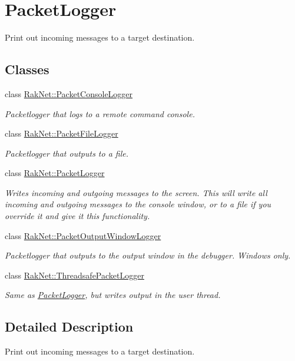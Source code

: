 \hypertarget{group___p_a_c_k_e_t_l_o_g_g_e_r___g_r_o_u_p}{\section{Packet\-Logger}
\label{group___p_a_c_k_e_t_l_o_g_g_e_r___g_r_o_u_p}
}


Print out incoming messages to a target destination.  


\subsection*{Classes}
\begin{DoxyCompactItemize}
\item 
class \hyperlink{class_rak_net_1_1_packet_console_logger}{Rak\-Net\-::\-Packet\-Console\-Logger}
\begin{DoxyCompactList}\small\item\em Packetlogger that logs to a remote command console. \end{DoxyCompactList}\item 
class \hyperlink{class_rak_net_1_1_packet_file_logger}{Rak\-Net\-::\-Packet\-File\-Logger}
\begin{DoxyCompactList}\small\item\em Packetlogger that outputs to a file. \end{DoxyCompactList}\item 
class \hyperlink{class_rak_net_1_1_packet_logger}{Rak\-Net\-::\-Packet\-Logger}
\begin{DoxyCompactList}\small\item\em Writes incoming and outgoing messages to the screen. This will write all incoming and outgoing messages to the console window, or to a file if you override it and give it this functionality. \end{DoxyCompactList}\item 
class \hyperlink{class_rak_net_1_1_packet_output_window_logger}{Rak\-Net\-::\-Packet\-Output\-Window\-Logger}
\begin{DoxyCompactList}\small\item\em Packetlogger that outputs to the output window in the debugger. Windows only. \end{DoxyCompactList}\item 
class \hyperlink{class_rak_net_1_1_threadsafe_packet_logger}{Rak\-Net\-::\-Threadsafe\-Packet\-Logger}
\begin{DoxyCompactList}\small\item\em Same as \hyperlink{class_rak_net_1_1_packet_logger}{Packet\-Logger}, but writes output in the user thread. \end{DoxyCompactList}\end{DoxyCompactItemize}


\subsection{Detailed Description}
Print out incoming messages to a target destination. 
